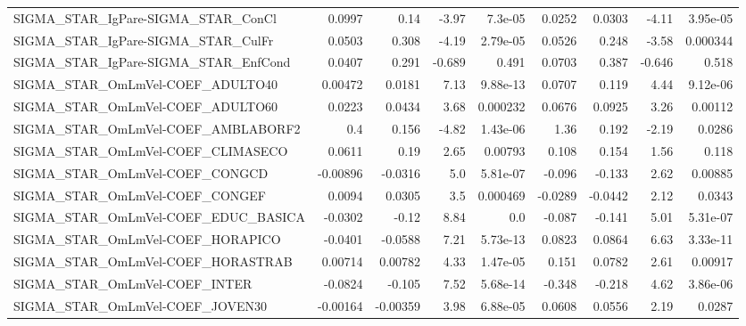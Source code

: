 \begin{tabular}{lrrrrrrrr}
SIGMA\_STAR\_IgPare-SIGMA\_STAR\_ConCl    &      0.0997 &         0.14 &    -3.97 &  7.3e-05 &     0.0252 &      0.0303 &        -4.11 &      3.95e-05 \\
SIGMA\_STAR\_IgPare-SIGMA\_STAR\_CulFr    &      0.0503 &        0.308 &    -4.19 & 2.79e-05 &     0.0526 &       0.248 &        -3.58 &      0.000344 \\
SIGMA\_STAR\_IgPare-SIGMA\_STAR\_EnfCond  &      0.0407 &        0.291 &   -0.689 &    0.491 &     0.0703 &       0.387 &       -0.646 &         0.518 \\
SIGMA\_STAR\_OmLmVel-COEF\_ADULTO40      &     0.00472 &       0.0181 &     7.13 & 9.88e-13 &     0.0707 &       0.119 &         4.44 &      9.12e-06 \\
SIGMA\_STAR\_OmLmVel-COEF\_ADULTO60      &      0.0223 &       0.0434 &     3.68 & 0.000232 &     0.0676 &      0.0925 &         3.26 &       0.00112 \\
SIGMA\_STAR\_OmLmVel-COEF\_AMBLABORF2    &         0.4 &        0.156 &    -4.82 & 1.43e-06 &       1.36 &       0.192 &        -2.19 &        0.0286 \\
SIGMA\_STAR\_OmLmVel-COEF\_CLIMASECO     &      0.0611 &         0.19 &     2.65 &  0.00793 &      0.108 &       0.154 &         1.56 &         0.118 \\
SIGMA\_STAR\_OmLmVel-COEF\_CONGCD        &    -0.00896 &      -0.0316 &      5.0 & 5.81e-07 &     -0.096 &      -0.133 &         2.62 &       0.00885 \\
SIGMA\_STAR\_OmLmVel-COEF\_CONGEF        &      0.0094 &       0.0305 &      3.5 & 0.000469 &    -0.0289 &     -0.0442 &         2.12 &        0.0343 \\
SIGMA\_STAR\_OmLmVel-COEF\_EDUC\_BASICA   &     -0.0302 &        -0.12 &     8.84 &      0.0 &     -0.087 &      -0.141 &         5.01 &      5.31e-07 \\
SIGMA\_STAR\_OmLmVel-COEF\_HORAPICO      &     -0.0401 &      -0.0588 &     7.21 & 5.73e-13 &     0.0823 &      0.0864 &         6.63 &      3.33e-11 \\
SIGMA\_STAR\_OmLmVel-COEF\_HORASTRAB     &     0.00714 &      0.00782 &     4.33 & 1.47e-05 &      0.151 &      0.0782 &         2.61 &       0.00917 \\
SIGMA\_STAR\_OmLmVel-COEF\_INTER         &     -0.0824 &       -0.105 &     7.52 & 5.68e-14 &     -0.348 &      -0.218 &         4.62 &      3.86e-06 \\
SIGMA\_STAR\_OmLmVel-COEF\_JOVEN30       &    -0.00164 &     -0.00359 &     3.98 & 6.88e-05 &     0.0608 &      0.0556 &         2.19 &        0.0287 \\

\end{tabular}

